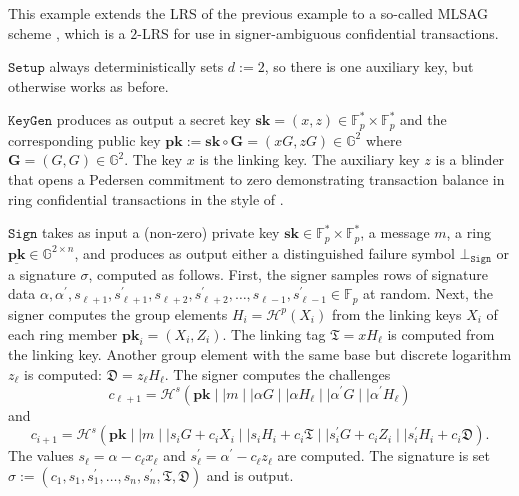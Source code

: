 \documentclass[draft]{llncs} %
\begin{document}
\begin{example}\label{ex:mlsag}
This example extends the LRS of the previous example to a so-called MLSAG scheme \cite{noether}, which is a $2$-LRS for use in signer-ambiguous confidential transactions.

$\texttt{Setup}$ always deterministically sets $d := 2$, so there is one auxiliary key, but otherwise works as before.

$\texttt{KeyGen}$ produces as output a secret key $\textbf{sk} = (x, z) \in \mathbb{F}_p^* \times \mathbb{F}_p^*$ and the corresponding public key  $\textbf{pk} := \textbf{sk} \circ \textbf{G} = (xG, zG) \in \mathbb{G}^2$ where $\textbf{G} = (G, G) \in \mathbb{G}^2$. The key $x$ is the linking key. The auxiliary key $z$ is a blinder that opens a Pedersen commitment to zero demonstrating transaction balance in ring confidential transactions in the style of \cite{noether}.

$\texttt{Sign}$ takes as input a (non-zero) private key $\textbf{sk} \in \mathbb{F}_p^* \times \mathbb{F}_p^*$, a message $m$, a ring $\underline{\textbf{pk}} \in \mathbb{G}^{2 \times n}$, and produces as output either a distinguished failure symbol $\bot_{\texttt{Sign}}$ or a signature $\sigma$, computed as follows. First, the signer samples rows of signature data  $\alpha, \alpha^\prime, s_{\ell + 1}, s^\prime_{\ell + 1}, s_{\ell + 2}, s^\prime_{\ell + 2}, \ldots, s_{\ell -1}, s^\prime_{\ell - 1} \in \mathbb{F}_p$ at random. Next, the signer computes the group elements $H_i = \mathcal{H}^p(X_i)$ from the linking keys $X_i$ of each ring member $\textbf{pk}_i = (X_i, Z_i)$. The linking tag $\mathfrak{T} = x H_\ell$ is computed from the linking key. Another group element with the same base but discrete logarithm $z_\ell$ is computed: $\mathfrak{D} = z_\ell H_\ell$. The signer computes the challenges
$$c_{\ell + 1} = \mathcal{H}^s(\textbf{pk} \mid \mid m \mid \mid \alpha G \mid \mid \alpha H_\ell \mid \mid \alpha^\prime G \mid \mid \alpha^\prime H_\ell)$$
and
$$c_{i+1} = \mathcal{H}^s(\textbf{pk} \mid \mid m \mid \mid s_i G + c_i X_i \mid \mid s_i H_i + c_i \mathfrak{T} \mid \mid s_i^\prime G + c_i Z_i \mid \mid s_i^\prime H_i + c_i \mathfrak{D}).$$
The values $s_\ell = \alpha - c_\ell x_\ell$ and $s_\ell^\prime = \alpha^\prime - c_\ell z_\ell$ are computed. The signature is set $\sigma := (c_1, s_1, s_1^\prime, \ldots, s_n, s_n^\prime, \mathfrak{T}, \mathfrak{D})$ and is output.


\end{example}
\end{document}
